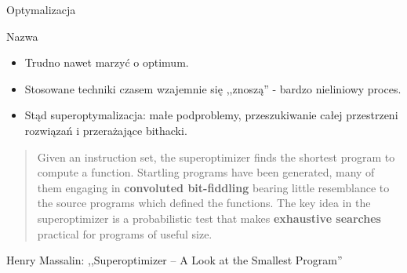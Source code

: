 \begin{frame}{Optymalizacja}
	\begin{block}{Nazwa}
		\begin{itemize}
			\item Trudno nawet marzyć o optimum.
			\item Stosowane techniki czasem wzajemnie się ,,znoszą'' - bardzo nieliniowy proces.
			\item Stąd superoptymalizacja: małe podproblemy, przeszukiwanie całej przestrzeni rozwiązań i przerażające bithacki.
		\end{itemize}
		\begin{quote}
			Given an instruction set, the superoptimizer finds the shortest program to compute a function.
			Startling programs have been generated, many of them engaging in \textbf{convoluted bit-fiddling} bearing little resemblance to the source programs which defined the functions.
			The key idea in the superoptimizer is a probabilistic test that makes \textbf{exhaustive searches} practical for programs of useful size.
		\end{quote}
		Henry Massalin: ,,Superoptimizer -- A Look at the Smallest Program''
	\end{block}
\end{frame}
